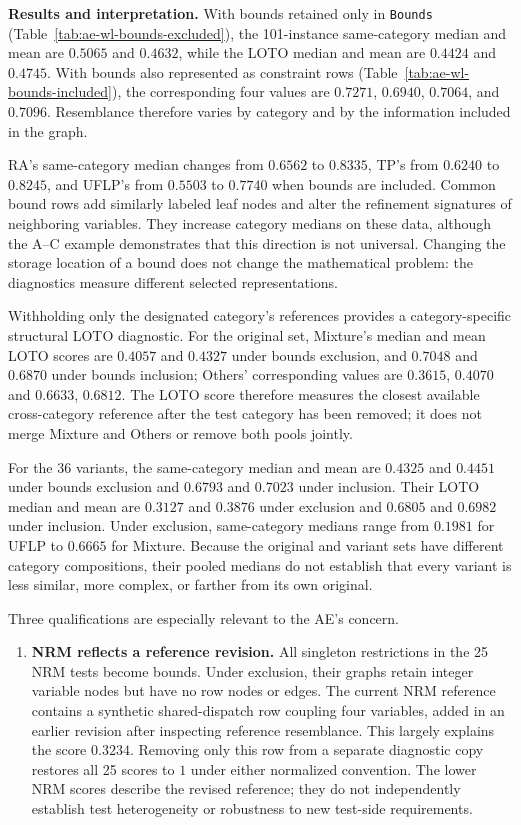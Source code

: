 \documentclass[11pt]{article}
\begin{document}
\begin{enumerate}[label=(AssoE.\arabic*),leftmargin=*]
\medskip
\textbf{Results and interpretation.}
With bounds retained only in \texttt{Bounds}
(Table~\ref{tab:ae-wl-bounds-excluded}), the 101-instance same-category
median and mean are $0.5065$ and $0.4632$, while the LOTO median and mean
are $0.4424$ and $0.4745$. With bounds also represented as constraint rows
(Table~\ref{tab:ae-wl-bounds-included}), the corresponding four values are
$0.7271$, $0.6940$, $0.7064$, and $0.7096$.
Resemblance therefore varies by category and by the information
included in the graph.

RA's same-category median changes from $0.6562$ to $0.8335$,
TP's from $0.6240$ to $0.8245$, and UFLP's from $0.5503$ to
$0.7740$ when bounds are included.
Common bound rows add similarly labeled leaf nodes and alter the
refinement signatures of neighboring variables.
They increase category medians on these data, although the A--C
example demonstrates that this direction is not universal.
Changing the storage location of a bound does not change the
mathematical problem: the diagnostics measure different selected
representations.

Withholding only the designated category's references provides a
category-specific structural LOTO diagnostic. For the original set,
Mixture's median and mean LOTO scores are $0.4057$ and $0.4327$ under
bounds exclusion, and $0.7048$ and $0.6870$ under bounds inclusion;
Others' corresponding values are $0.3615$, $0.4070$ and $0.6633$,
$0.6812$. The LOTO score therefore measures the closest available
cross-category reference after the test category has been removed; it
does not merge Mixture and Others or remove both pools jointly.

For the 36 variants, the same-category median and mean are $0.4325$ and
$0.4451$ under bounds exclusion and $0.6793$ and $0.7023$ under
inclusion. Their LOTO median and mean are $0.3127$ and $0.3876$ under
exclusion and $0.6805$ and $0.6982$ under inclusion. Under exclusion,
same-category medians range from $0.1981$ for UFLP to $0.6665$ for
Mixture.
Because the original and variant sets have different category
compositions, their pooled medians do not establish that every
variant is less similar, more complex, or farther from its own original.

Three qualifications are especially relevant to the AE's concern.
\begin{enumerate}
\item \textbf{NRM reflects a reference revision.}
All singleton restrictions in the 25 NRM tests become bounds.
Under exclusion, their graphs retain integer variable nodes but
have no row nodes or edges.
The current NRM reference contains a synthetic shared-dispatch row
coupling four variables, added in an earlier revision after
inspecting reference resemblance. This largely explains the score
$0.3234$. Removing only this row from a separate diagnostic copy
restores all 25 scores to $1$ under either normalized convention.
The lower NRM scores describe the revised reference; they do not
independently establish test heterogeneity or robustness to new
test-side requirements.


\end{enumerate}
\end{enumerate}
\end{document}

